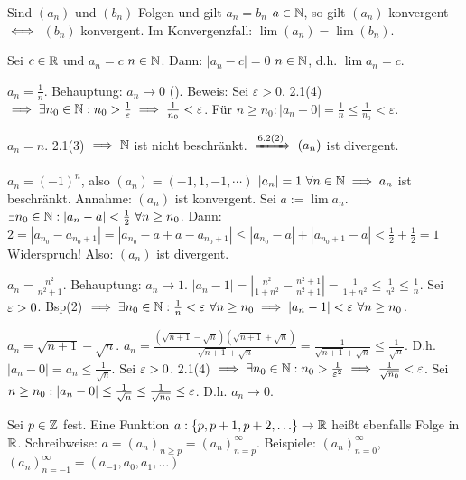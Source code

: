 \documentclass[a4paper,oneside,DIV15,BCOR12mm]{scrbook}
\begin{document}
\begin{bemerkung}
Sind $(a_n)$ und $(b_n)$ Folgen und gilt $a_n = b_n$ \ffa $a\in\mathbb{N}$, so gilt $(a_n)$ konvergent $\iff$ $(b_n)$ konvergent. Im Konvergenzfall: $\lim(a_n) = \lim(b_n)$.
\end{bemerkung}

\begin{beispiele}
\item Sei $c \in \mathbb{R}$ und $a_n = c$ \ffa $n\in\mathbb{N}$. Dann: $|a_n - c| =0$ \ffa $n\in\mathbb{N}$, d.h. $\lim{a_n} = c$.
\item $a_n = \frac{1}{n}$. Behauptung: $a_n \to 0$ (). Beweis: Sei $\varepsilon > 0$. 2.1(4) $\implies \exists n_0 \in \mathbb{N}: n_0 > \frac{1}\varepsilon \implies \frac{1}{n_0} < \varepsilon$. Für $n \ge n_0: |a_n - 0| = \frac{1}{n} \le \frac{1}{n_0} < \varepsilon$.
\item $a_n = n$. 2.1(3) $\implies \mathbb{N}$ ist nicht beschränkt. $\folgtnach{6.2(2)} (a_n)$ ist divergent.
\item $a_n = (-1)^n$, also $(a_n) = (-1, 1, -1, \cdots)$ $|a_n|=1 \ \forall n\in\mathbb{N} \implies a_n$ ist beschränkt. Annahme: $(a_n)$ ist konvergent. Sei $a:=\lim a_n$. $\exists n_0\in\mathbb{N} : |a_n - a| < \frac{1}{2}\ \forall n \ge n_0$. Dann: $2=|a_{n_0}-a_{n_0+1}|=|a_{n_0}-a+a-a_{n_0+1}|\le|a_{n_0}-a|+|a_{n_0+1}-a|<\frac{1}{2} + \frac{1}{2}=1$ Widerspruch! Also: $(a_n)$ ist divergent.
\item $a_n = \frac{n^2}{n^2 + 1}$. Behauptung: $a_n \to 1$. $|a_n-1|=|\frac{n^2}{1+n^2}-\frac{n^2+1}{n^2+1}|=\frac{1}{1+n^2}\le\frac{1}{n^2}\le\frac{1}{n}$. Sei $\varepsilon>0$. Bsp(2) $\folgt \exists n_0 \in \MdN: \frac{1}{n}<\ep\ \forall n \ge n_0 \folgt |a_n-1|<\ep\ \forall n\ge n_0$.
\item $a_n = \sqrt{n+1}-\sqrt{n}$. $a_n = \frac{(\sqrt{n+1}-\sqrt{n})(\sqrt{n+1}+\sqrt{n})}{\sqrt{n+1}+\sqrt{n}}=\frac{1}{\sqrt{n+1}+\sqrt{n}}\le\frac{1}{\sqrt{n}}$. D.h. $|a_n-0|=a_n\le\frac{1}{\sqrt{n}}$. Sei $\varepsilon>0$. 2.1(4) $\implies \exists n_0\in\mathbb{N}: n_0>\frac{1}{{\varepsilon}^2}\implies\frac{1}{\sqrt{n_0}}<\varepsilon$. Sei $n \ge n_0: |a_n-0| \le \frac{1}{\sqrt{n}} \le \frac{1}{\sqrt{n_0}} \le \varepsilon$. D.h. $a_n \to 0$.
\end{beispiele}

\begin{bemerkung}
Sei $p\in\mathbb{Z}$ fest. Eine Funktion $a:\{p,p+1,p+2,\ldots\} \to \mathbb{R}$ heißt ebenfalls Folge in $\mathbb{R}$. Schreibweise: $a = (a_n)_{n\ge p} = (a_n)_{n = p}^\infty$. Beispiele: $(a_n)_{n=0}^\infty$, $(a_n)_{n=-1}^\infty = (a_{-1}, a_0, a_1, \ldots)$
\end{bemerkung}
\end{document}
